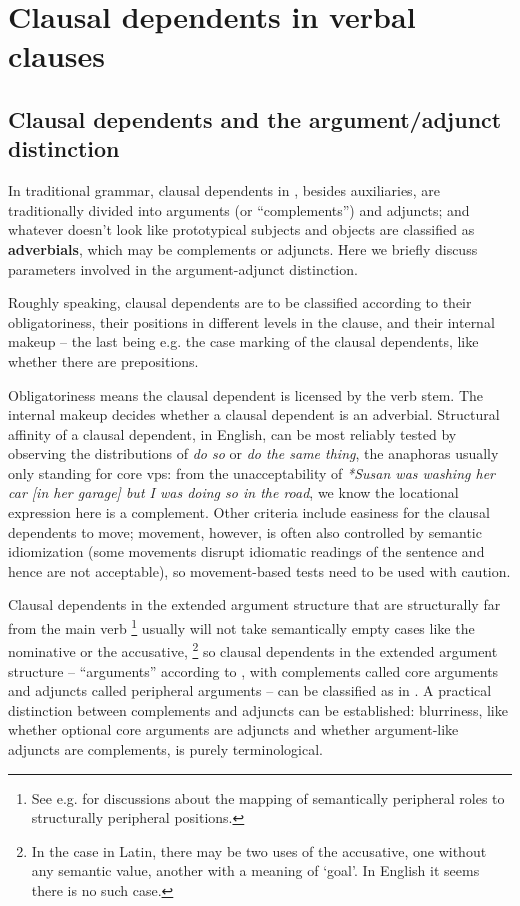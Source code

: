\documentclass[UTF8, a4paper, oneside, scheme=plain, 12pt]{ctexbook}
\newcommand*{\citepage}[1]{p.~{#1}}
\newcommand*{\concept}[1]{\textbf{#1}}
\newcommand{\form}[1]{\emph{#1}}
\newcommand{\translate}[1]{`#1'}
\begin{document}
\section{Clausal dependents in verbal clauses}\label{sec:simple-clause.verbal-valency}

\subsection{Clausal dependents and the argument/adjunct distinction}

In traditional grammar,
clausal dependents in ,
besides auxiliaries, are traditionally divided into arguments (or ``complements'') and adjuncts; 
and whatever doesn't look like prototypical subjects and objects 
are classified as \concept{adverbials}, 
which may be complements or adjuncts.
Here we briefly discuss parameters involved in the argument-adjunct distinction.

Roughly speaking, clausal dependents are to be classified according to
their obligatoriness, their positions in different levels in the clause,
and their internal makeup
-- the last being e.g. the case marking of the clausal dependents,
like whether there are prepositions.

Obligatoriness means the clausal dependent is licensed by the verb stem.
The internal makeup decides whether a clausal dependent is an adverbial.
Structural affinity of a clausal dependent, in English, can be most reliably tested 
by observing the distributions of \form{do so} or \form{do the same thing},
the anaphoras usually only standing for core \ac{vp}s:
from the unacceptability of \form{*Susan was washing her car [in her garage] but I was doing so in the road},
we know the locational expression here is a complement.
Other criteria include easiness for the clausal dependents to move;
movement, however, is often also controlled by semantic idiomization 
(some movements disrupt idiomatic readings of the sentence and hence are not acceptable),
so movement-based tests need to be used with caution.

Clausal dependents in the extended argument structure 
that are structurally far from the main verb
\footnote{
    See e.g. \citet[\citepage{30}]{cinque1999adverbs}
    for discussions about the mapping of semantically peripheral roles
    to structurally peripheral positions.
}
usually will not take semantically empty cases like the nominative or the accusative,%
\footnote{
    In the case in Latin, there may be two uses of the accusative,
    one without any semantic value,
    another with a meaning of \translate{goal}.
    In English it seems there is no such case.
}
so clausal dependents in the extended argument structure
-- ``arguments'' according to \citet{dixon2009basic1},
with complements called core arguments 
and adjuncts called peripheral arguments
-- can be classified as in .
A practical distinction between complements and adjuncts can be established:
blurriness, like whether optional core arguments are adjuncts 
and whether argument-like adjuncts are complements,
is purely terminological. 
\end{document}
